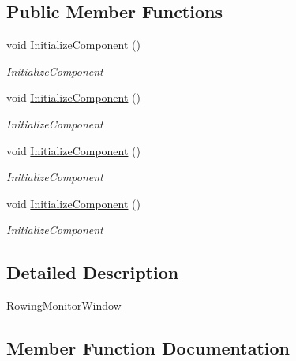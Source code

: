 \subsection*{Public Member Functions}
\begin{DoxyCompactItemize}
\item 
void \hyperlink{class_rowing_monitor_1_1_rowing_monitor_window_ace5d64ad5ace3448f5390d3bb57ddc2e}{Initialize\+Component} ()
\begin{DoxyCompactList}\small\item\em Initialize\+Component \end{DoxyCompactList}\item 
void \hyperlink{class_rowing_monitor_1_1_rowing_monitor_window_ace5d64ad5ace3448f5390d3bb57ddc2e}{Initialize\+Component} ()
\begin{DoxyCompactList}\small\item\em Initialize\+Component \end{DoxyCompactList}\item 
void \hyperlink{class_rowing_monitor_1_1_rowing_monitor_window_ace5d64ad5ace3448f5390d3bb57ddc2e}{Initialize\+Component} ()
\begin{DoxyCompactList}\small\item\em Initialize\+Component \end{DoxyCompactList}\item 
void \hyperlink{class_rowing_monitor_1_1_rowing_monitor_window_ace5d64ad5ace3448f5390d3bb57ddc2e}{Initialize\+Component} ()
\begin{DoxyCompactList}\small\item\em Initialize\+Component \end{DoxyCompactList}\end{DoxyCompactItemize}


\subsection{Detailed Description}
\hyperlink{class_rowing_monitor_1_1_rowing_monitor_window}{Rowing\+Monitor\+Window} 



\subsection{Member Function Documentation}
\mbox{\label{class_rowing_monitor_1_1_rowing_monitor_window_ace5d64ad5ace3448f5390d3bb57ddc2e}} 
